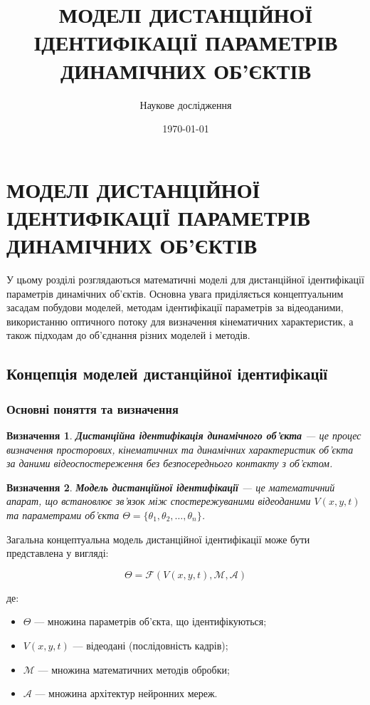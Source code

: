 \documentclass[14pt, a4paper]{extarticle}
\title{МОДЕЛІ ДИСТАНЦІЙНОЇ ІДЕНТИФІКАЦІЇ ПАРАМЕТРІВ ДИНАМІЧНИХ ОБ'ЄКТІВ}
\author{Наукове дослідження}
\date{\today}
\numberwithin{equation}{section}
\newtheorem{definition}{Визначення}[section]
\begin{document}
\maketitle

\tableofcontents

\newpage

\section{МОДЕЛІ ДИСТАНЦІЙНОЇ ІДЕНТИФІКАЦІЇ ПАРАМЕТРІВ ДИНАМІЧНИХ ОБ'ЄКТІВ}

У цьому розділі розглядаються математичні моделі для дистанційної ідентифікації параметрів динамічних об'єктів. Основна увага приділяється концептуальним засадам побудови моделей, методам ідентифікації параметрів за відеоданими, використанню оптичного потоку для визначення кінематичних характеристик, а також підходам до об'єднання різних моделей і методів.

\subsection{Концепція моделей дистанційної ідентифікації}

\subsubsection{Основні поняття та визначення}

\begin{definition}
\textbf{Дистанційна ідентифікація динамічного об'єкта} — це процес визначення просторових, кінематичних та динамічних характеристик об'єкта за даними відеоспостереження без безпосереднього контакту з об'єктом.
\end{definition}

\begin{definition}
\textbf{Модель дистанційної ідентифікації} — це математичний апарат, що встановлює зв'язок між спостережуваними відеоданими $V(x,y,t)$ та параметрами об'єкта $\Theta = \{\theta_1, \theta_2, \ldots, \theta_n\}$.
\end{definition}

Загальна концептуальна модель дистанційної ідентифікації може бути представлена у вигляді:

\begin{equation}
\boxed{\Theta = \mathcal{F}(V(x,y,t), \mathcal{M}, \mathcal{A})} \tag{1}
\end{equation}

де:
\begin{itemize}
\item $\Theta$ — множина параметрів об'єкта, що ідентифікуються;
\item $V(x,y,t)$ — відеодані (послідовність кадрів);
\item $\mathcal{M}$ — множина математичних методів обробки;
\item $\mathcal{A}$ — множина архітектур нейронних мереж.
\end{itemize}
\end{document}
